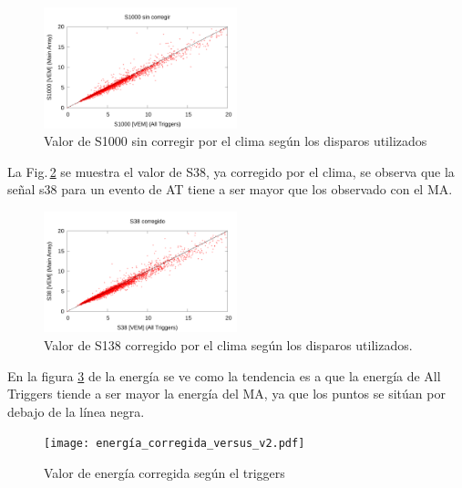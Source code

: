 \begin{figure}[H]
    \begin{small}
        \begin{center}
            \includegraphics[width=0.5\textwidth]{s1000_versus_v2.pdf}
        \end{center}
        \caption{Valor de S1000 sin corregir por el clima según los disparos utilizados }
        \label{fig:s1000versus}
    \end{small}
\end{figure}


La Fig.\,\ref{fig:s38versus} se muestra el valor de S38, ya corregido por el clima, se observa que la señal s38 para un evento de AT tiene a ser mayor que los observado con el MA.

\begin{figure}[H]
    \begin{small}
        \begin{center}
            \includegraphics[width=0.5\textwidth]{s38_corregido_versus_v2.pdf}
        \end{center}
        \caption{Valor de S138 corregido por el clima según los disparos utilizados. }
        \label{fig:s38versus}
    \end{small}
\end{figure}


En la figura \ref{fig:energiaversus} de  la energía se ve como la tendencia es a que la energía de All Triggers tiende a ser mayor la energía del MA, ya que los puntos se sitúan por debajo de la línea negra.

\begin{figure}[H]
    \begin{small}
        \begin{center}
            \texttt{[image: energía\_corregida\_versus\_v2.pdf]}
        \end{center}
        \caption{Valor de energía corregida según el triggers }
        \label{fig:energiaversus}
    \end{small}
\end{figure}


